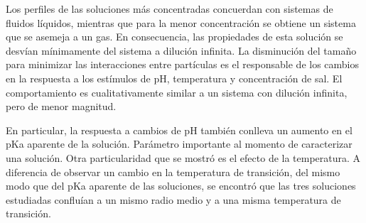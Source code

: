 	Los perfiles de las soluciones m\'as concentradas concuerdan con sistemas de fluidos l\'iquidos, mientras que para la menor concentraci\'on se obtiene un sistema que se asemeja a un gas. En consecuencia, las propiedades de esta soluci\'on se desv\'ian m\'inimamente del sistema a diluci\'on infinita.
	La disminuci\'on del  tama\~no para minimizar las interacciones entre part\'iculas es el responsable de los cambios en la respuesta a los est\'imulos de pH, temperatura y concentraci\'on de sal. El comportamiento es cualitativamente similar a un sistema con diluci\'on infinita, pero de menor magnitud.
	
	En particular, la respuesta a cambios de pH tambi\'en conlleva un aumento en el pKa aparente de la soluci\'on. Par\'ametro importante al momento de caracterizar una soluci\'on.
	Otra particularidad que se mostr\'o es el efecto de la temperatura. A diferencia de observar un cambio en la temperatura de transici\'on, del mismo modo que del pKa aparente de las soluciones, se encontr\'o que las tres soluciones estudiadas conflu\'ian a un mismo radio medio y a una misma temperatura de transici\'on.
	
	
